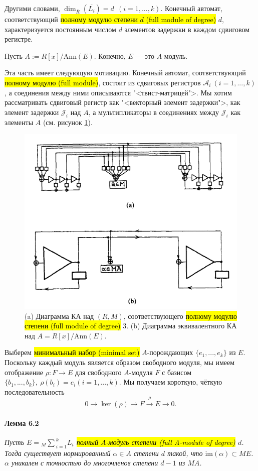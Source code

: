 \documentclass[a4paper,12pt]{article}
\newcommand{\dirsummod}[1]{{_{{#1}}\!\!\sum}}
\newcommand{\Ann}{\text{Ann}}
\newcommand{\im}{\text{im}}
\begin{document}
Другими словами, $\dim_{\bar{R}} (\overline{L_i}) = d ~~ (i = 1, ..., k)$. Конечный автомат, соответствующий \hl{полному модулю степени $d$ (full module of degree)} $d$, характеризуется постоянным числом $d$ элементов задержки в каждом сдвиговом регистре.

Пусть $A := R[x] / \Ann(E)$. Конечно, $E$ --- это $A$-модуль.

Эта часть имеет следующую мотивацию. Конечный автомат, соответствующий \hl{полному модулю (full module)}, состоит из сдвиговых регистров $\mathcal{A}_i ~ (i = 1, ..., k)$, а соединения между ними описываются "<твист-матрицей">. Мы хотим рассматривать сдвиговый регистр как "<векторный элемент задержки">, как элемент задержки $\mathcal{J}_i$ над $A$, а мультипликаторы в соединениях между  $\mathcal{J}_i$ как элементы $A$ (см. рисунок \ref{fig6ab}).

\begin{figure}[h]
	\centering
	\includegraphics[width=0.7\linewidth]{pictures/fig6ab.png}
	\caption{(a) Диаграмма КА над $(R, M)$, соответствующего \hl{полному модулю степени (full module of degree)} 3. (b) Диаграмма эквивалентного КА над $A = R[x] / \Ann (E)$.}
	\label{fig6ab}
\end{figure}

Выберем \hl{минимальный набор (minimal set)} $A$-порождающих $\{e_1, ..., e_k\}$ из $E$. Поскольку каждый модуль является образом свободного модуля, мы имеем отображение $\rho : F \rightarrow E$ для свободного $A$-модуля $F$ с базисом $\{b_1, ..., b_k\}, ~ \rho(b_i) = e_i (i = 1, ..., k)$. Мы получаем короткую, чёткую последовательность
$$
0 \rightarrow \ker (\rho) \rightarrow F \overset{\rho}{\rightarrow} E \rightarrow 0.
$$

\paragraph{Лемма 6.2}
{\itshape
Пусть $E = \dirsummod{M}_{i=1}^k L_i$ \hl{полный $A$-модуль степени (full A-module of degree)} $d$. Тогда существует нормированный $\alpha \in A$ степени $d$ такой, что $\im (\alpha) \subset M E$. $\alpha$ уникален с точностью до многочленов степени $d - 1$ из $M A$.
}
\end{document}
